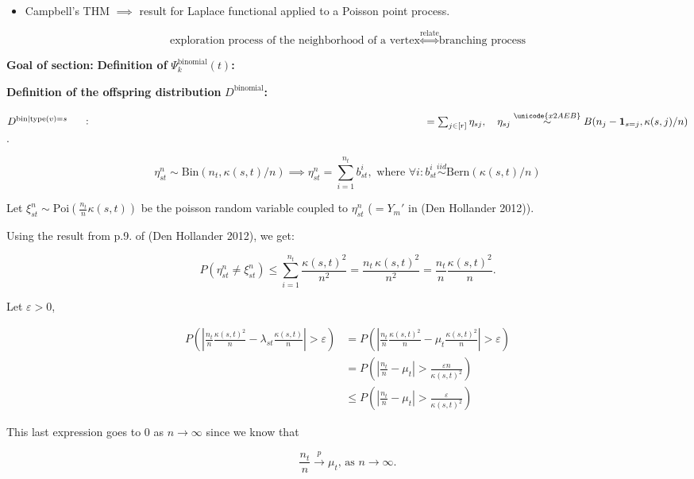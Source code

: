 \documentclass[
  letterpaper,
  DIV=11,
  numbers=noendperiod]{scrartcl}
\providecommand{\tightlist}{%
  \setlength{\itemsep}{0pt}\setlength{\parskip}{0pt}}\usepackage{longtable,booktabs,array}
\begin{document}
\begin{itemize}
\tightlist
\item
  Campbell's THM \(\implies\) result for Laplace functional applied to a
  Poisson point process.
\end{itemize}

\[\text{exploration process of the neighborhood of a vertex} \stackrel{\text{relate}}{\iff} \text{branching process}\]

\textbf{Goal of section:} \textbf{Definition of}
\(\Psi_k^{\text{binomial}}(t)\)\textbf{:}

\textbf{Definition of the offspring distribution}
\(D^{\text{binomial}}\)\textbf{:}

\(D^{\text{bin}|\text{type}(v)=s} \mathrel{\vcenter{:}}= \sum_{j \in [r]} \eta_{sj}, \quad \eta_{sj} \stackrel{\unicode{x2AEB}}{\sim} B(n_j - \mathbf{1}_{s=j}, \kappa(s, j) / n)\).

\[
\eta_{st}^n \sim \text{Bin}(n_t, \kappa(s, t) / n) \implies \eta_{st}^n = \sum_{i=1}^{n_t} b_{st}^i, \text{ where } \forall i: b_{st}^i \stackrel{iid}{\sim} \text{Bern}(\kappa(s, t) / n)
\]

Let \(\xi_{st}^n \sim \text{Poi}(\frac{n_t}{n} \kappa(s, t))\) be the
poisson random variable coupled to \(\eta_{st}^n\) (\(= Y_m'\) in (Den
Hollander 2012)).

Using the result from p.9. of (Den Hollander 2012), we get:

\[
P(\eta_{st}^n \neq \xi_{st}^n) \leq \sum_{i=1}^{n_t} \frac{\kappa(s,t)^2}{n^2}= \frac{n_t \, \kappa(s,t)^2}{n^2} = \frac{n_t}{n} \frac{\kappa(s,t)^2}{n}.
\]

Let \(\varepsilon > 0\),

\[
\begin{align*}
P\left( \left|\frac{n_t}{n} \frac{\kappa(s,t)^2}{n} - \lambda_{st} \frac{\kappa(s,t)}{n}\right| > \varepsilon \right) &= P\left( \left|\frac{n_t}{n} \frac{\kappa(s,t)^2}{n} - \mu_{t} \frac{\kappa(s,t)^2}{n}\right| > \varepsilon \right) \\
&= P\left( \left|\frac{n_t}{n} - \mu_{t}\right| > \frac{\varepsilon n}{\kappa(s,t)^2} \right) \\
&\leq P\left( \left|\frac{n_t}{n} - \mu_{t}\right| > \frac{\varepsilon}{\kappa(s,t)^2} \right)
\end{align*}
\]

This last expression goes to \(0\) as \(n \to \infty\) since we know
that

\[
\frac{n_t}{n} \xrightarrow{p} \mu_{t}, \, \text{as } n \to \infty.
\]
\end{document}
